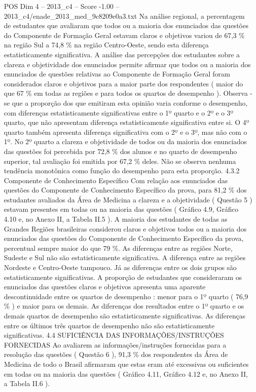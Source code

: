 \begin{textsample}{POS Dim 4 – 2013\_c4 – Score -1.00 – 2013\_c4/enade\_2013\_med\_9c8209e0a3.txt}
Na análise regional, a percentagem de estudantes que avaliaram que todos ou a maioria dos enunciados das questões do Componente de Formação Geral estavam claros e objetivos variou de 67,3 \% na região Sul a 74,8 \% na região Centro-Oeste, sendo esta diferença estatisticamente significativa.
A análise das percepções dos estudantes sobre a clareza e objetividade dos enunciados permite afirmar que todos ou a maioria dos enunciados de questões relativas ao Componente de Formação Geral foram considerados claros e objetivos para a maior parte dos respondentes ( maior do que 67 \% em todas as regiões e para todos os quartos de desempenho ).
Observa -se que a proporção dos que emitiram esta opinião varia conforme o desempenho, com diferenças estatisticamente significativas entre o 1º quarto e o 2º e o 3º quarto, que não apresentam diferença estatisticamente significativa entre si.
O 4º quarto também apresenta diferença significativa com o 2º e o 3º, mas não com o 1º.
No 2º quarto a clareza e objetividade de todos ou da maioria dos enunciados das questões foi percebida por 72,8 \% dos alunos e no quarto de desempenho superior, tal avaliação foi emitida por 67,2 \% deles.
Não se observa nenhuma tendência monotônica como função do desempenho para esta proporção. 4.3.2 Componente de Conhecimento Específico Com relação aos enunciados das questões do Componente de Conhecimento Específico da prova, para 81,2 \% dos estudantes avaliados da Área de Medicina a clareza e a objetividade ( Questão 5 ) estavam presentes em todas ou na maioria das questões ( Gráfico 4.9, Gráfico 4.10 e, no Anexo II, a Tabela II.5 ).
A maioria dos estudantes de todas as Grandes Regiões brasileiras considerou claros e objetivos todos ou a maioria dos enunciados das questões do Componente de Conhecimento Específico da prova, percentual sempre maior do que 79 \%.
As diferenças entre as regiões Norte, Sudeste e Sul não são estatisticamente significativa.
A diferença entre as regiões Nordeste e Centro-Oeste tampouco.
Já as diferenças entre os dois grupos são estatisticamente significativas.
A proporção de estudantes que consideraram os enunciados das questões claros e objetivos apresenta uma aparente descontinuidade entre os quartos de desempenho : menor para o 1º quarto ( 76,9 \% ) e maior para os demais.
As diferenças dos resultados entre o 1º quarto e os demais quartos de desempenho são estatisticamente significativas.
As diferenças entre os últimos três quartos de desempenho não são estatisticamente significativas. 4.4 SUFICIÊNCIA DAS INFORMAÇÕES/INSTRUÇÕES FORNECIDAS Ao avaliarem as informações/instruções fornecidas para a resolução das questões ( Questão 6 ), 91,3 \% dos respondentes da Área de Medicina de todo o Brasil afirmaram que estas eram até excessivas ou suficientes em todas ou na maioria das questões ( Gráfico 4.11, Gráfico 4.12 e, no Anexo II, a Tabela II.6 ).

\end{textsample}
